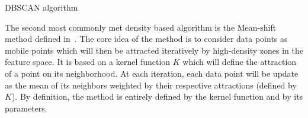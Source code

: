 \begin{algorithm}
    \caption{DBSCAN algorithm}
\label{alg:dbscan}

    \end{algorithm}


    The second most commonly met density based algorithm is the Mean-shift method defined in~\cite{cheng1995mean}. The core idea of the method is to consider data points as mobile points which will then be attracted iteratively by high-density zones in the feature space. It is based on a kernel function $K$ which will define the attraction of a point on its neighborhood. At each iteration, each data point will be update as the mean of its neighbors weighted by their respective attractions (defined by $K$). By definition, the method is entirely defined by the kernel function and by its parameters.


